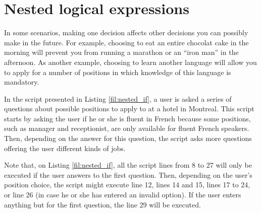 \section{Nested logical expressions}

In some scenarios, making one decision affects other decisions you can possibly make in the future. For example, choosing to eat an entire chocolat cake in the morning will prevent you from running a marathon or an ``iron man'' in the afternoon. As another example, choosing to learn another language will allow you to apply for a number of positions in which knowledge of this language is mandatory.

In the script presented in Listing \ref{fil:nested_if}, a user is asked a series of questions about possible positions to apply to at a hotel in Montreal. This script starts by asking the user if he or she is fluent in French because some positions, such as manager and receptionist, are only available for fluent French speakers. Then, depending on the answer for this question, the script asks more questions offering the user different kinds of jobs. 


Note that, on Listing \ref{fil:nested_if}, all the script lines from 8 to 27 will only be executed if the user answers  to the first question. Then, depending on the user's position choice, the script might execute line 12, lines 14 and 15, lines 17 to 24, or line 26 (in case he or she has entered an invalid option). If the user enters anything but  for the first question, the line 29 will be executed.

